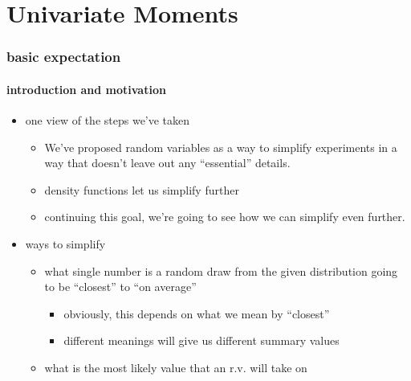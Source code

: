 

\part*{Univariate Moments}%

\section{basic expectation}

\subsection{introduction and motivation}

\begin{itemize}
\item one view of the steps we've taken
\begin{itemize}
\item We've proposed random variables as a way to simplify experiments
         in a way that doesn't leave out any ``essential'' details.
\item density functions let us simplify further
\item continuing this goal, we're going to see how we can simplify even further.
\end{itemize}
\item ways to simplify
\begin{itemize}
\item what single number is a random draw from the given distribution
         going to be ``closest'' to ``on average''
\begin{itemize}
\item obviously, this depends on what we mean by ``closest''
\item different meanings will give us different summary values
\end{itemize}
\item what is the most likely value that an r.v. will take on
\end{itemize}
\end{itemize}

